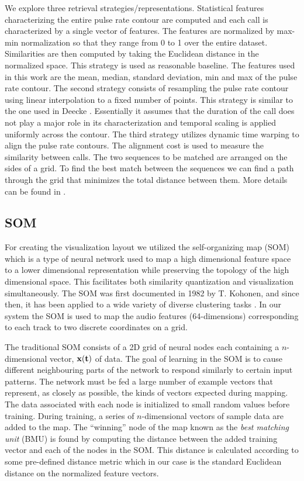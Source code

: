 We explore three retrieval strategies/representations. Statistical
features characterizing the entire pulse rate contour are computed and
each call is characterized by a single vector of features. The
features are normalized by max-min normalization so that they range
from 0 to 1 over the entire dataset. Similarities are then computed by
taking the Euclidean distance in the normalized space. This strategy
is used as reasonable baseline. The features used in this work are the mean, median,
standard deviation, min and max of the pulse rate contour. The second
strategy consists of resampling the pulse rate contour using linear
interpolation to a fixed number of points. This strategy is similar to
the one used in Deecke \cite{deecke99_quantifying_orca}. Essentially
it assumes that the duration of the call does not play a major role in
its characterization and temporal scaling is applied uniformly across
the contour. The third strategy utilizes dynamic time warping to align
the pulse rate contours. The alignment cost is used to measure the
similarity between calls. The two sequences to be matched are arranged
on the sides of a grid. To find the best match between the sequences
we can find a path through the grid that minimizes the total distance
between them. More details can be found in \cite{sakoe78}.


\subsection{SOM}


For creating the visualization layout we utilized the self-organizing
map (SOM) which is a type of neural network used to map a high
dimensional feature space to a lower dimensional representation while
preserving the topology of the high dimensional space. This
facilitates both similarity quantization and visualization
simultaneously. The SOM was first documented in 1982 by T. Kohonen,
and since then, it has been applied to a wide variety of diverse
clustering tasks \cite{kohonen95a}. In our system the SOM is used to
map the audio features (64-dimensions) corresponding to each track
 to two discrete coordinates on a grid.

 The traditional SOM consists of a 2D grid of neural nodes each
 containing a $n$-dimensional vector, $ {\bf x(t)} $ of data. The goal
 of learning in the SOM is to cause different neighbouring parts of
 the network to respond similarly to certain input patterns. The
 network must be fed a large number of example vectors that represent,
 as closely as possible, the kinds of vectors expected during
 mapping. The data associated with each node is initialized to small
 random values before training. During training, a series of
 $n$-dimensional vectors of sample data are added to the map.  The
 ``winning'' node of the map known as the {\it best matching unit}
 (BMU) is found by computing the distance between the added training
 vector and each of the nodes in the SOM. This distance is calculated
 according to some pre-defined distance metric which in our case is
 the standard Euclidean distance on the normalized feature vectors.

